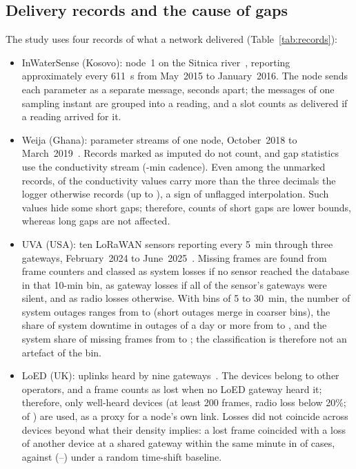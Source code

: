 \subsection{Delivery records and the cause of gaps}
\label{sec:data-records}
The study uses four records of what a network delivered (Table~\ref{tab:records}):
\begin{itemize}
\item InWaterSense (Kosovo): node~1 on the Sitnica river~\cite{ahmedi2022dataset,ahmedi2021inwatersense}, reporting approximately every 611~s from May~2015 to January~2016. The node sends each parameter as a separate message, seconds apart; the messages of one sampling instant are grouped into a reading, and a slot counts as delivered if a reading arrived for it.
\item Weija (Ghana): \weijaStreamsWord{} parameter streams of one node, October~2018 to March~2019~\cite{adumanu2020smart}. Records marked as imputed do not count, and gap statistics use the conductivity stream (\weijaCondStepMin-min cadence). Even among the unmarked records, \weijaManyDecimals{} of the conductivity values carry more than the three decimals the logger otherwise records (up to \weijaMaxDecimals), a sign of unflagged interpolation. Such values hide some short gaps; therefore, counts of short gaps are lower bounds, whereas long gaps are not affected.
\item UVA (USA): ten LoRaWAN sensors reporting every 5~min through three gateways, February~2024 to June~2025~\cite{nikseresht2025uva,nikseresht2025uvadata}. Missing frames are found from frame counters and classed as system losses if no sensor reached the database in that 10-min bin, as gateway losses if all of the sensor's gateways were silent, and as radio losses otherwise. With bins of 5 to 30~min, the number of system outages ranges from \uvaBinOutMax{} to \uvaBinOutMin{} (short outages merge in coarser bins), the share of system downtime in outages of a day or more from \uvaBinDayMin{} to \uvaBinDayMax, and the system share of missing frames from \uvaBinSysMin{} to \uvaBinSysMax; the classification is therefore not an artefact of the bin.
\item LoED (UK): uplinks heard by nine gateways~\cite{bhatia2020loed,bhatia2020loeddata}. The devices belong to other operators, and a frame counts as lost when no LoED gateway heard it; therefore, only well-heard devices (at least 200 frames, radio loss below 20\%; \loedWellHeard{} of \loedDevicesTwoHundred) are used, as a proxy for a node's own link. Losses did not coincide across devices beyond what their density implies: a lost frame coincided with a loss of another device at a shared gateway within the same minute in \loedCoLoss{} of cases, against \loedCoLossBase{} (\loedCoLossLo--\loedCoLossHi) under a random time-shift baseline.
\end{itemize}
